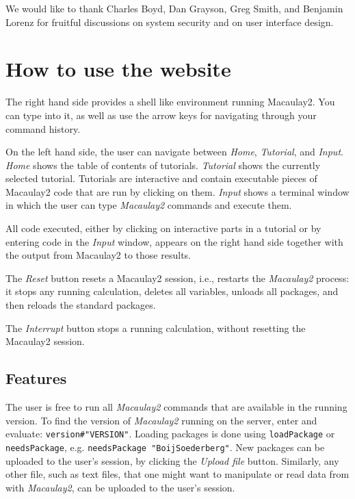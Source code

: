 \documentclass[twocolumn]{article}
\def\M2{{\it Macaulay2}}
\begin{document}
We would like to thank Charles Boyd, Dan Grayson, Greg Smith, and Benjamin Lorenz for
fruitful discussions on system security and on user interface design.

\section{How to use the website}
The right hand side provides a shell like environment running
Macaulay2. You can type into it, as well as use the arrow keys for
navigating through your command history.

On the left hand side, the user can navigate between {\it Home}, {\it
  Tutorial}, and {\it Input}. {\it Home} shows the table of contents
of tutorials. {\it Tutorial} shows the currently selected
tutorial. Tutorials are interactive and contain executable pieces of
Macaulay2 code that are run by clicking on them. {\it Input} shows a
terminal window in which the user can type {\it Macaulay2} commands and execute them.

All code executed, either by clicking on interactive parts in a
tutorial or by entering code in the {\it Input} window, appears on the
right hand side together with the output from Macaulay2 to those
results.

The {\it Reset} button resets a Macaulay2 session, i.e., restarts 
the \M2 process: it stops any running calculation, deletes all variables, 
unloads all packages, and then reloads the standard packages.

The {\it Interrupt} button stops a running calculation, without
resetting the Macaulay2 session.

\subsection{Features}

The user is free to run all \M2 commands that are available in the
running version. To find the version of \M2 running on the server,
enter and evaluate: {\tt version\#"VERSION"}.  Loading packages is
done using {\tt loadPackage} or {\tt needsPackage}, e.g. {\tt needsPackage "BoijSoederberg"}.  
New packages can be
uploaded to the user's session, by clicking the {\it Upload file}
button. Similarly, any other file, such as text files, that one might
want to manipulate or read data from with \M2, can be uploaded to
the user's session.

\end{document}
